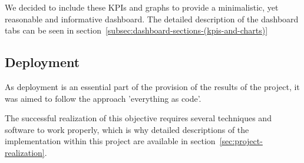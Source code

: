 We decided to include these KPIs and graphs to provide a minimalistic, yet reasonable and informative dashboard.
The detailed description of the dashboard tabs can be seen in section~\ref{subsec:dashboard-sections-(kpis-and-charts)}



\subsection{Deployment}\label{subsec:deployment}
As deployment is an essential part of the provision of the results of the project, it was aimed to follow the approach 'everything as code'.

The successful realization of this objective requires several techniques and software to work properly, which is why detailed descriptions of the implementation within this project are available in section~\ref{sec:project-realization}.